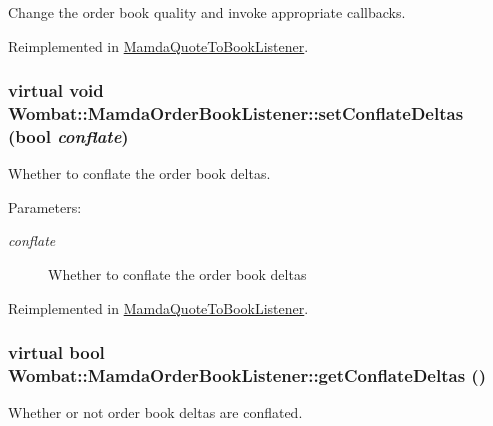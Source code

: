 Change the order book quality and invoke appropriate callbacks. 



Reimplemented in \hyperlink{classMamdaQuoteToBookListener_185182e79f1a315dd2667b44cb466159}{Mamda\-Quote\-To\-Book\-Listener}.\hypertarget{classWombat_1_1MamdaOrderBookListener_0b19000efe1f7135813b810dbe2e78ff}{
\subsubsection[setConflateDeltas]{\setlength{\rightskip}{0pt plus 5cm}virtual void Wombat::Mamda\-Order\-Book\-Listener::set\-Conflate\-Deltas (bool {\em conflate})}}
\label{classWombat_1_1MamdaOrderBookListener_0b19000efe1f7135813b810dbe2e78ff}


Whether to conflate the order book deltas. 

\begin{Desc}
\item[Parameters:]
\begin{description}
\item[{\em conflate}]Whether to conflate the order book deltas \end{description}
\end{Desc}


Reimplemented in \hyperlink{classMamdaQuoteToBookListener_fc20509b396b145818c6804ad7a72d63}{Mamda\-Quote\-To\-Book\-Listener}.\hypertarget{classWombat_1_1MamdaOrderBookListener_2f72b21861b1f4a0462624eaa236a298}{
\subsubsection[getConflateDeltas]{\setlength{\rightskip}{0pt plus 5cm}virtual bool Wombat::Mamda\-Order\-Book\-Listener::get\-Conflate\-Deltas ()}}
\label{classWombat_1_1MamdaOrderBookListener_2f72b21861b1f4a0462624eaa236a298}


Whether or not order book deltas are conflated. 

